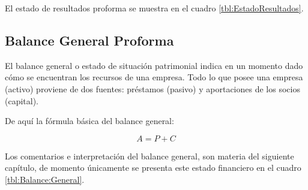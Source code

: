 El estado de resultados proforma se muestra en el cuadro \ref{tbl:EstadoResultados}.

\subsection{Balance General Proforma}

El balance general o estado de situación patrimonial indica en un momento dado cómo se encuentran los recursos de una empresa. Todo lo que posee una empresa (activo) proviene de dos fuentes: préstamos (pasivo) y aportaciones de los socios (capital).

De aquí la fórmula básica del balance general:

$$ A = P + C $$

Los comentarios e interpretación del balance general, son materia del siguiente capítulo, de momento únicamente se presenta este estado financiero en el cuadro \ref{tbl:Balance:General}.




